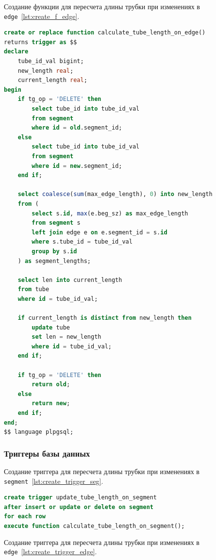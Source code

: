 \noindent
\hspace{1.25cm}
Создание функции для пересчета длины трубки при изменениях в \texttt{edge}~\ref{lst:create_f_edge}.

\begin{lstlisting}[caption={Функция для пересчета длины трубки при изменениях в \texttt{edge}}, label=lst:create_f_edge, language=SQL]
create or replace function calculate_tube_length_on_edge()
returns trigger as $$
declare
    tube_id_val bigint;
    new_length real;
    current_length real;
begin
    if tg_op = 'DELETE' then
        select tube_id into tube_id_val
        from segment
        where id = old.segment_id;
    else
        select tube_id into tube_id_val
        from segment
        where id = new.segment_id;
    end if;

    select coalesce(sum(max_edge_length), 0) into new_length
    from (
        select s.id, max(e.beg_sz) as max_edge_length
        from segment s
        left join edge e on e.segment_id = s.id
        where s.tube_id = tube_id_val
        group by s.id
    ) as segment_lengths;

    select len into current_length
    from tube
    where id = tube_id_val;

    if current_length is distinct from new_length then
        update tube
        set len = new_length
        where id = tube_id_val;
    end if;

    if tg_op = 'DELETE' then
        return old;
    else
        return new;
    end if;
end;
$$ language plpgsql;
\end{lstlisting}

\subsubsection{Триггеры базы данных}

\noindent
\hspace{1.25cm}
Создание триггера для пересчета длины трубки при изменениях в \texttt{segment}~\ref{lst:create_trigger_seg}.

\begin{lstlisting}[caption={Триггер для пересчета длины трубки при изменениях в \texttt{segment}}, label=lst:create_trigger_seg, language=SQL]
create trigger update_tube_length_on_segment
after insert or update or delete on segment
for each row
execute function calculate_tube_length_on_segment();
\end{lstlisting}

\noindent
\hspace{1.25cm}
Создание триггера для пересчета длины трубки при изменениях в \texttt{edge}~\ref{lst:create_trigger_edge}.


